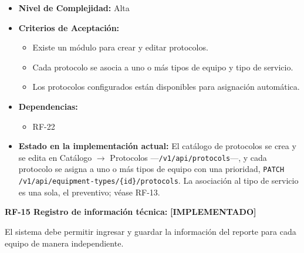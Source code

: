 \documentclass[12pt,a4paper]{article}
\newcommand{\ruta}[1]{\nolinkurl{#1}}
\newcommand{\estadoImplementado}{\textcolor{mainRed}{\textbf{[IMPLEMENTADO]}}}
\begin{document}
\begin{itemize}
  \item \textbf{Nivel de Complejidad:} Alta

  \item \textbf{Criterios de Aceptación:}
  \begin{itemize}
    \item Existe un módulo para crear y editar protocolos.
    \item Cada protocolo se asocia a uno o más tipos de equipo y tipo de servicio.
    \item Los protocolos configurados están disponibles para asignación automática.
  \end{itemize}

  \item \textbf{Dependencias:}
  \begin{itemize}
    \item RF-22
  \end{itemize}

  \item \textbf{Estado en la implementación actual:} El catálogo de protocolos se crea y se edita en Catálogo $\rightarrow$ Protocolos —\ruta{/v1/api/protocols}—, y cada protocolo se asigna a uno o más tipos de equipo con una prioridad, \texttt{PATCH} \ruta{/v1/api/equipment-types/{id}/protocols}. La asociación al tipo de servicio es una sola, el preventivo; véase RF-13.
\end{itemize}

\textbf{RF-15 Registro de información técnica:} \estadoImplementado{}

El sistema debe permitir ingresar y guardar la información del reporte para cada equipo de manera independiente.
\end{document}
